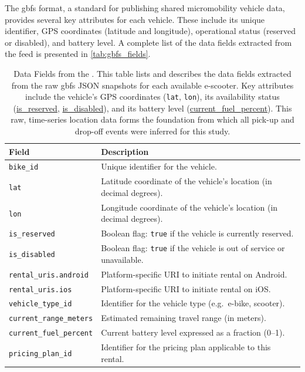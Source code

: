 The \gls{gbfs} format, a standard for publishing shared micromobility vehicle data, provides several key attributes for each vehicle.
These include its unique identifier, GPS coordinates (latitude and longitude), operational status (reserved or disabled), and battery level.
A complete list of the data fields extracted from the feed is presented in \autoref{tab:gbfs_fields}.

\begin{table}[!htb]
    \centering
    \begin{tabularx}{\textwidth}{lX}
        \toprule
        \textbf{Field} & \textbf{Description} \\ 
        \midrule
        \texttt{bike\_id}              & Unique identifier for the vehicle. \\
        \texttt{lat}                   & Latitude coordinate of the vehicle's location (in decimal degrees). \\
        \texttt{lon}                   & Longitude coordinate of the vehicle's location (in decimal degrees). \\
        \texttt{is\_reserved}          & Boolean flag: \texttt{true} if the vehicle is currently reserved. \\
        \texttt{is\_disabled}          & Boolean flag: \texttt{true} if the vehicle is out of service or unavailable. \\
        \texttt{rental\_uris.android}  & Platform-specific URI to initiate rental on Android. \\
        \texttt{rental\_uris.ios}      & Platform-specific URI to initiate rental on iOS. \\
        \texttt{vehicle\_type\_id}     & Identifier for the vehicle type (e.g.\ e-bike, scooter). \\
        \texttt{current\_range\_meters}& Estimated remaining travel range (in meters). \\
        \texttt{current\_fuel\_percent}& Current battery level expressed as a fraction (0–1). \\
        \texttt{pricing\_plan\_id}     & Identifier for the pricing plan applicable to this rental. \\
        \bottomrule
    \end{tabularx}
    \caption{Data Fields from the  \cite{mobilitydata_specification_2024}. This table lists and describes the data fields extracted from the raw \gls{gbfs} JSON snapshots for each available e-scooter. Key attributes include the vehicle's GPS coordinates (\texttt{lat}, \texttt{lon}), its availability status (\url{is\_reserved}, \url{is\_disabled}), and its battery level (\url{current\_fuel\_percent}). This raw, time-series location data forms the foundation from which all pick-up and drop-off events were inferred for this study.}
    \label{tab:gbfs_fields}
\end{table}


